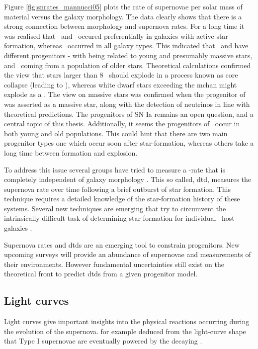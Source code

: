 Figure \ref{fig:snrates_mannucci05} plots the rate of supernovae per solar mass of material versus the galaxy morphology. The data clearly shows that there is a strong connection between morphology and supernova rates. For a long time it was realised that \sneii\ and \sneibc\ occured preferentially in galaxies with active star formation, whereas \sneia\ occurred in all galaxy types. This indicated that \sneia\ and \sneiiibc have different progenitors - with \sneiiibc being related to young and presumably massive stars, and \sneia\ coming from a population of older stars. Theoretical calculations confirmed the view that stars larger than 8 \msun\ should explode in a process known as core collapse (leading to \sneiiibc), whereas white dwarf stars exceeding the \gls{mchan} might explode as a \snia. 
 The view on massive stars was confirmed when the progenitor of  was asserted as a massive star, along with the detection of neutrinos in line with theoretical predictions. The progenitors of SN Ia remains an open question, and a central topic of this thesis. Additionally, it seems the progenitors of \sneia\ occur in both young and old populations. This could hint that there are two main progenitor types one which occur soon after star-formation, whereas others take a long time between formation and explosion. 

To address this issue several groups have tried to measure a \sneia-rate that is completely independent of galaxy morphology \citep[e.g.][]{2006MNRAS.370..773M, 2010ApJ...722.1879M}. This so called, \gls{dtd}, measures the supernova rate over time following a brief outburst of star formation.
This technique requires a detailed knowledge of the star-formation history of these systems. Several new techniques are emerging that try to circumvent the intrinsically difficult task of determining star-formation for individual \sneia\ host galaxies \citep{2010MNRAS.407.1314M, 2010arXiv1010.5786B, 2008PASJ...60.1327T, 2010ApJ...722.1879M}.

Supernova rates and \glspl{dtd} are an emerging tool to constrain progenitors. New upcoming surveys will provide an abundance of supernovae and measurements of their environments.  However fundamental uncertainties still exist on the theoretical front to predict \glspl{dtd} from a given progenitor model.

\subsection{Light curves} 
\label{sec:intro_lc}
Light curves give important insights into the physical reactions occurring during the evolution of the supernova. \cite{1982ApJ...253..785A} for example deduced from the light-curve shape that Type I supernovae are eventually powered by the decaying \Co. 


